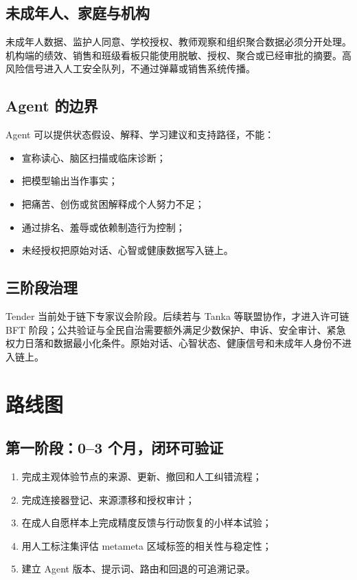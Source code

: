 \documentclass[UTF8,a4paper,11pt]{ctexart}
\begin{document}
\subsection{未成年人、家庭与机构}

未成年人数据、监护人同意、学校授权、教师观察和组织聚合数据必须分开处理。机构端的绩效、销售和班级看板只能使用脱敏、授权、聚合或已经审批的摘要。高风险信号进入人工安全队列，不通过弹幕或销售系统传播。

\subsection{Agent 的边界}

Agent 可以提供状态假设、解释、学习建议和支持路径，不能：

\begin{itemize}
\item 宣称读心、脑区扫描或临床诊断；
\item 把模型输出当作事实；
\item 把痛苦、创伤或贫困解释成个人努力不足；
\item 通过排名、羞辱或依赖制造行为控制；
\item 未经授权把原始对话、心智或健康数据写入链上。
\end{itemize}

\subsection{三阶段治理}

Tender 当前处于链下专家议会阶段。后续若与 Tanka 等联盟协作，才进入许可链 BFT 阶段；公共验证与全民自治需要额外满足少数保护、申诉、安全审计、紧急权力日落和数据最小化条件。原始对话、心智状态、健康信号和未成年人身份不进入链上。

\newpage
\section{路线图}

\subsection{第一阶段：0--3 个月，闭环可验证}

\begin{enumerate}
\item 完成主观体验节点的来源、更新、撤回和人工纠错流程；
\item 完成连接器登记、来源漂移和授权审计；
\item 在成人自愿样本上完成精度反馈与行动恢复的小样本试验；
\item 用人工标注集评估 metameta 区域标签的相关性与稳定性；
\item 建立 Agent 版本、提示词、路由和回退的可追溯记录。
\end{enumerate}
\end{document}
